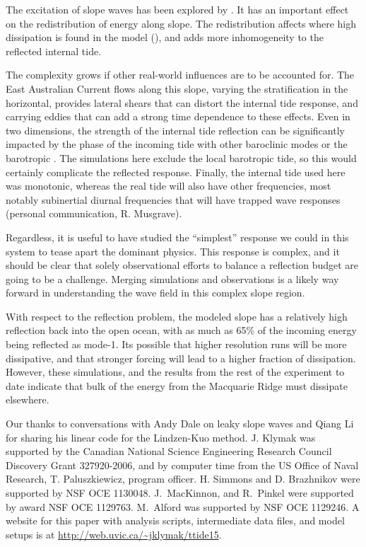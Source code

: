 \documentclass[12pt]{article}
\begin{document}
The excitation of slope waves has been explored by \citet{daleetal01}. It has an important effect on the redistribution of energy along slope.  The redistribution affects where high dissipation is found in the model (), and adds more inhomogeneity to the reflected internal tide.    

The complexity grows if other real-world influences are to be accounted for.  The East Australian Current flows along this slope, varying the stratification in the horizontal, provides lateral shears that can distort the internal tide response, and carrying eddies that can add a strong time dependence to these effects.  Even in two dimensions, the strength of the  internal tide reflection can be significantly impacted by the phase of the incoming tide with other baroclinic modes \citet{klymaketal11a} or the barotropic \citep{kellynash10}.
The simulations here exclude the local barotropic tide, so this would certainly complicate the reflected response.  Finally, the internal tide used here was monotonic, whereas the real tide will also have other frequencies, most notably subinertial diurnal frequencies that will have trapped wave responses (personal communication, R. Musgrave).  

Regardless, it is useful to have studied the ``simplest'' response we could in this system to tease apart the dominant physics.  This response is complex, and it should be clear that solely observational efforts to balance a reflection budget are going to be a challenge.  Merging simulations and observations is a likely way forward in understanding the wave field in this complex slope region.

With respect to the reflection problem, the modeled slope has a relatively high reflection back into the open ocean, with as much as 65\% of the incoming energy being reflected as mode-1.  Its possible that higher resolution runs will be more dissipative, and that stronger forcing will lead to a higher fraction of dissipation.  However, these simulations, and the results from the rest of the experiment to date \citep[i.e.][]{johnstonetal15} indicate that bulk of the energy from the Macquarie Ridge must dissipate elsewhere.  

\begin{acknowledgment} 
Our thanks to conversations with Andy Dale on leaky slope waves and Qiang Li for sharing his linear code for the Lindzen-Kuo method.  
J. Klymak was supported by the Canadian National Science Engineering Research Council Discovery Grant 327920-2006, and by computer time from the US Office of Naval Research, T. Paluszkiewicz, program officer.  H. Simmons and D. Brazhnikov were supported by NSF OCE 1130048.  J.\ MacKinnon, and R.\ Pinkel were supported by award  NSF OCE 1129763. M.\ Alford was supported by NSF OCE 1129246.
 A website for this paper with analysis scripts, intermediate data files, and model setups is at \url{http://web.uvic.ca/~jklymak/ttide15}.  

\end{acknowledgment}
\end{document}
